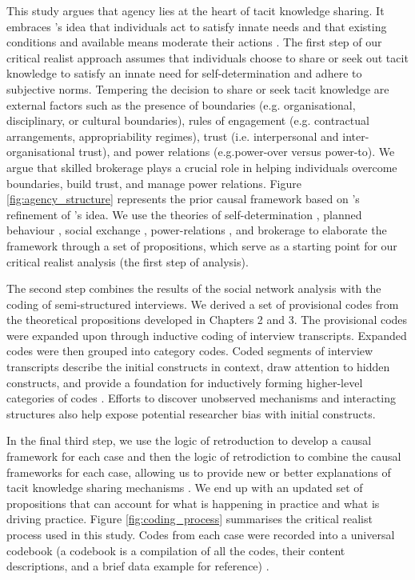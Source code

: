 This study argues that agency lies at the heart of tacit knowledge sharing. It embraces \citet{parsons1937structure}'s idea that individuals act to satisfy innate needs and that existing conditions and available means moderate their actions \citep{loyal2001agency}. The first step of our critical realist approach assumes that individuals choose to share or seek out tacit knowledge to satisfy an innate need for self-determination and adhere to subjective norms. Tempering the decision to share or seek tacit knowledge are external factors such as the presence of boundaries (e.g. organisational, disciplinary, or cultural boundaries), rules of engagement (e.g. contractual arrangements, appropriability regimes), trust (i.e. interpersonal and inter-organisational trust), and power relations (e.g.power-over versus power-to). We argue that skilled brokerage plays a crucial role in helping individuals overcome boundaries, build trust, and manage power relations. Figure \ref{fig:agency_structure} represents the prior causal framework based on \citet{loyal2001agency}'s refinement of \citet{parsons1937structure}'s idea. We use the theories of self-determination \citep{ryan2000self}, planned behaviour \citep{ajzen1985intentions}, social exchange \citep{blau1964exchange}, power-relations \citep{emerson1962power}, and brokerage \citep{marsden1982brokerage,burt2005brokerage,obstfeld2014brokerage} to elaborate the framework through a set of propositions, which serve as a starting point for our critical realist analysis (the first step of analysis). \medskip

The second step combines the results of the social network analysis with the coding of semi-structured interviews. We derived a set of provisional codes from the theoretical propositions developed in Chapters 2 and 3. The provisional codes were expanded upon through inductive coding of interview transcripts. Expanded codes were then grouped into category codes. Coded segments of interview transcripts describe the initial constructs in context, draw attention to hidden constructs, and provide a foundation for inductively forming higher-level categories of codes \citep{saldana2015coding}. Efforts to discover unobserved mechanisms and interacting structures also help expose potential researcher bias with initial constructs. \medskip

In the final third step, we use the logic of retroduction to develop a causal framework for each case and then the logic of retrodiction to combine the causal frameworks for each case, allowing us to provide new or better explanations of tacit knowledge sharing mechanisms \citep{mcavoy2018critical}. We end up with an updated set of propositions that can account for what is happening in practice and what is driving practice. Figure \ref{fig:coding_process} summarises the critical realist process used in this study. Codes from each case were recorded into a universal codebook (a codebook is a compilation of all the codes, their content descriptions, and a brief data example for reference) \citep{guest2011applied}. 

